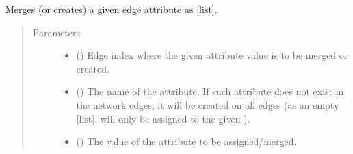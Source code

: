 \documentclass[letterpaper,10pt,english]{sphinxmanual}
\begin{document}
\begin{fulllineitems}
\begin{fulllineitems}
\begin{quote}
\begin{description}
\begin{itemize}
\end{itemize}

\end{description}\end{quote}

\end{fulllineitems}


\begin{fulllineitems}
\label{\detokenize{reference:pypath.main.PyPath.add_list_eattr}}
Merges (or creates) a given edge attribute as {[}list{]}.
\begin{quote}\begin{description}
\item[{Parameters}] \leavevmode\begin{itemize}
\item {} 
 () \textendash{} Edge index where the given attribute value is to be merged
or created.

\item {} 
 () \textendash{} The name of the attribute. If such attribute does not exist
in the network edges, it will be created on all edges (as an
empty {[}list{]},  will only be assigned to the given
).

\item {} 
 () \textendash{} The value of the attribute to be assigned/merged.

\end{itemize}

\end{description}\end{quote}

\end{fulllineitems}



\end{fulllineitems}
\end{document}
